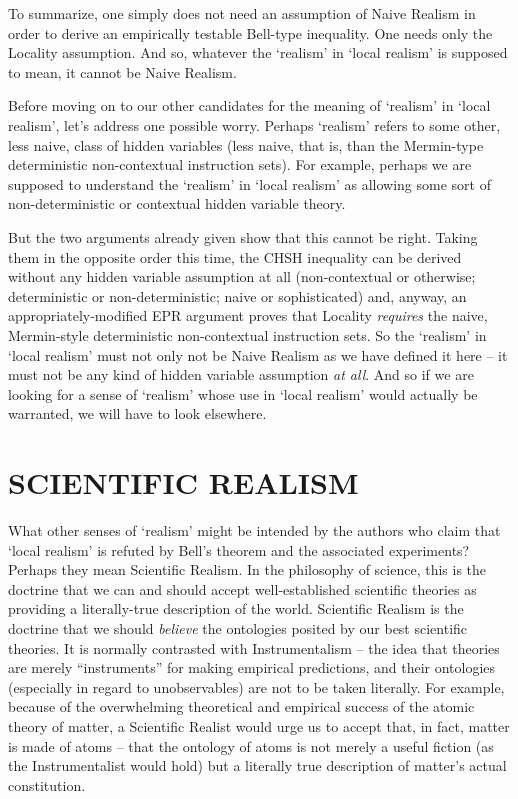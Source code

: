 \documentclass[12pt]{article}
\begin{document}
To summarize, one simply does not need an assumption of Naive Realism
in order to derive an empirically testable Bell-type inequality.  One
needs only the Locality assumption.  And so, whatever the `realism'
in `local realism' is supposed to mean, it cannot be Naive Realism.

Before moving on to our other candidates for the meaning of
`realism' in `local realism', let's address one possible worry.
Perhaps `realism' refers to some other, less naive, class of hidden
variables (less naive, that is, than the Mermin-type
deterministic non-contextual instruction sets).  For example, perhaps
we are supposed to understand the `realism' in `local realism' as
allowing some sort of non-deterministic or contextual hidden
variable theory.  

But the two arguments already given show that this cannot be right.
Taking them in the opposite order this time, the CHSH inequality can
be derived without any hidden variable assumption at all
(non-contextual or otherwise; deterministic or non-deterministic; 
naive or sophisticated) and, anyway, an appropriately-modified EPR
argument proves that Locality \emph{requires} the naive, Mermin-style 
deterministic non-contextual instruction sets. \cite{nonlocchar}  So the
`realism' in `local realism' must not only not be Naive Realism as
we have defined it here -- it must not be any kind of hidden variable
assumption \emph{at all}.  And so if we are looking for a sense of
`realism' whose use in `local realism' would actually be
warranted, we will have to look elsewhere.


\section{SCIENTIFIC REALISM}

What other senses of `realism' might be intended by the authors who
claim that `local realism' is refuted by Bell's theorem and the
associated experiments?  Perhaps they mean Scientific Realism.  In the
philosophy of science, this is the doctrine that we can and should
accept well-established scientific theories as providing a
literally-true description of the world.  Scientific Realism is the
doctrine that we should \emph{believe} the ontologies posited by our
best scientific theories.  It is normally contrasted with
Instrumentalism -- the idea that theories are merely ``instruments''
for making empirical predictions, and their ontologies (especially in
regard to unobservables) are not to be taken literally.  
For example, because of the overwhelming
theoretical and empirical success of the atomic theory of matter, a
Scientific Realist would urge us to accept
that, in fact, matter is made of atoms -- that the ontology of atoms is not
merely a useful fiction (as the Instrumentalist would hold) but a
literally true description of matter's actual constitution. \cite{scirealism}
\end{document}
